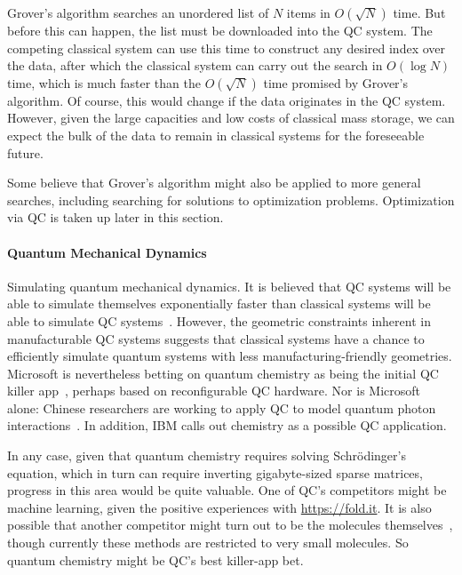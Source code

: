 Grover's algorithm searches an unordered list of $N$ items
in $O(\sqrt N)$ time.
But before this can happen, the list must be downloaded into
the QC system.
The competing classical system can use this time to construct
any desired index over the data, after which the classical
system can carry out the search in $O(\log N)$ time, which
is much faster than the $O(\sqrt N)$ time promised by
Grover's algorithm.
Of course, this would change if the data originates in the
QC system.
However, given the large capacities and low costs of
classical mass storage, we can expect the bulk of the data to remain
in classical systems for the foreseeable future.

Some believe that Grover's algorithm might also be applied to more general
searches, including searching for solutions to optimization problems.
Optimization via QC is taken up later in this section.

\paragraph{Quantum Mechanical Dynamics}
\label{sec:future:Quantum Mechanical Dynamics}

Simulating quantum mechanical dynamics.
It is believed that QC systems will be able to simulate themselves
exponentially faster than classical systems will be able to
simulate QC systems~\cite{Feynman1982}.
However, the geometric constraints inherent in manufacturable
QC systems suggests that classical systems have a chance
to efficiently simulate quantum systems with less
manufacturing-friendly geometries.
Microsoft is nevertheless betting on quantum chemistry as being
the initial QC killer app~\cite{TomSimonite2017QC-MS-Chemistry},
perhaps based on reconfigurable QC hardware.
Nor is Microsoft alone: Chinese researchers are working to apply
QC to model quantum photon interactions~\cite{StephenChen2017ChinaQC}.
In addition, IBM calls out chemistry as a possible QC application.

In any case, given that quantum chemistry requires solving
Schr\"{o}dinger's equation, which in turn can require inverting
gigabyte-sized sparse matrices, progress in this area would
be quite valuable.
One of QC's competitors might be machine learning, given the positive
experiences with \url{https://fold.it}.
It is also possible that another competitor might turn out to be the
molecules themselves~\cite{Chin-wenChou2017ManipulateMolecule}, though
currently these methods are restricted to very small molecules.
So quantum chemistry might be QC's best killer-app bet.

